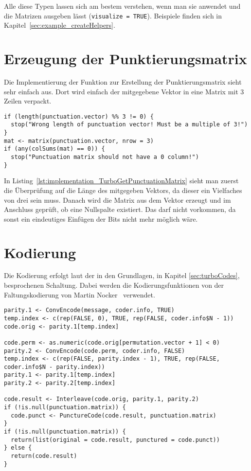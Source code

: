 Alle diese Typen lassen sich am bestem verstehen, wenn man sie anwendet und die Matrizen ausgeben lässt (\texttt{visualize = TRUE}). Beispiele finden sich in Kapitel~\ref{sec:example_createHelpers}.

\FloatBarrier
\section{Erzeugung der Punktierungsmatrix}
\label{sec:implementation_puncturing}
Die Implementierung der Funktion zur Erstellung der Punktierungsmatrix sieht sehr einfach aus. Dort wird einfach der mitgegebene Vektor in eine Matrix mit 3 Zeilen verpackt. 

\begin{lstlisting}[caption=Implementierung von \texttt{TurboGetPunctuationMatrix}, label={lst:implementation_TurboGetPunctuationMatrix}, float=!th]
if (length(punctuation.vector) %% 3 != 0) {
  stop("Wrong length of punctuation vector! Must be a multiple of 3!")
}
mat <- matrix(punctuation.vector, nrow = 3)
if (any(colSums(mat) == 0)) {
  stop("Punctuation matrix should not have a 0 column!")
}
\end{lstlisting}

In Listing~\ref{lst:implementation_TurboGetPunctuationMatrix} sieht man zuerst die Überprüfung auf die Länge des mitgegeben Vektors, da dieser ein Vielfaches von drei sein muss. Danach wird die Matrix aus dem Vektor erzeugt und im Anschluss geprüft, ob eine Nullspalte existiert. Das darf nicht vorkommen, da sonst ein eindeutiges Einfügen der Bits nicht mehr möglich wäre.

\FloatBarrier
\section{Kodierung}
\label{sec:implementation_encode}
Die Kodierung erfolgt laut der in den Grundlagen, in Kapitel \ref{sec:turboCodes}, besprochenen Schaltung. Dabei werden die Kodierungsfunktionen von der Faltungskodierung von Martin Nocker~\cite[S.~25~f.]{nocker} verwendet.

\begin{lstlisting}[caption=Implementierung von \texttt{TurboEncode}, label={lst:implementation_TurboEncode}, float=!th]
parity.1 <- ConvEncode(message, coder.info, TRUE)
temp.index <- c(rep(FALSE, 0), TRUE, rep(FALSE, coder.info$N - 1))
code.orig <- parity.1[temp.index]

code.perm <- as.numeric(code.orig[permutation.vector + 1] < 0)
parity.2 <- ConvEncode(code.perm, coder.info, FALSE)
temp.index <- c(rep(FALSE, parity.index - 1), TRUE, rep(FALSE, coder.info$N - parity.index))
parity.1 <- parity.1[temp.index]
parity.2 <- parity.2[temp.index]

code.result <- Interleave(code.orig, parity.1, parity.2)
if (!is.null(punctuation.matrix)) {
  code.punct <- PunctureCode(code.result, punctuation.matrix)
}
if (!is.null(punctuation.matrix)) {
  return(list(original = code.result, punctured = code.punct))
} else {
  return(code.result)
}
\end{lstlisting}

